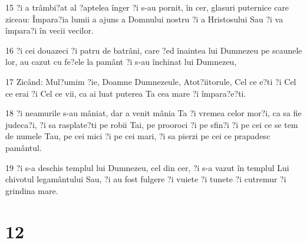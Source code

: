 \par 15 ?i a trâmbi?at al ?aptelea înger ?i s-au pornit, în cer, glasuri puternice care ziceau: Împara?ia lumii a ajuns a Domnului nostru ?i a Hristosului Sau ?i va împara?i în vecii vecilor.
\par 16 ?i cei douazeci ?i patru de batrâni, care ?ed înaintea lui Dumnezeu pe scaunele lor, au cazut cu fe?ele la pamânt ?i s-au închinat lui Dumnezeu,
\par 17 Zicând: Mul?umim ?ie, Doamne Dumnezeule, Atot?iitorule, Cel ce e?ti ?i Cel ce erai ?i Cel ce vii, ca ai luat puterea Ta cea mare ?i împara?e?ti.
\par 18 ?i neamurile s-au mâniat, dar a venit mânia Ta ?i vremea celor mor?i, ca sa fie judeca?i, ?i sa rasplate?ti pe robii Tai, pe prooroci ?i pe sfin?i ?i pe cei ce se tem de numele Tau, pe cei mici ?i pe cei mari, ?i sa pierzi pe cei ce prapadesc pamântul.
\par 19 ?i s-a deschis templul lui Dumnezeu, cel din cer, ?i s-a vazut în templul Lui chivotul legamântului Sau, ?i au fost fulgere ?i vuiete ?i tunete ?i cutremur ?i grindina mare.

\chapter{12}

